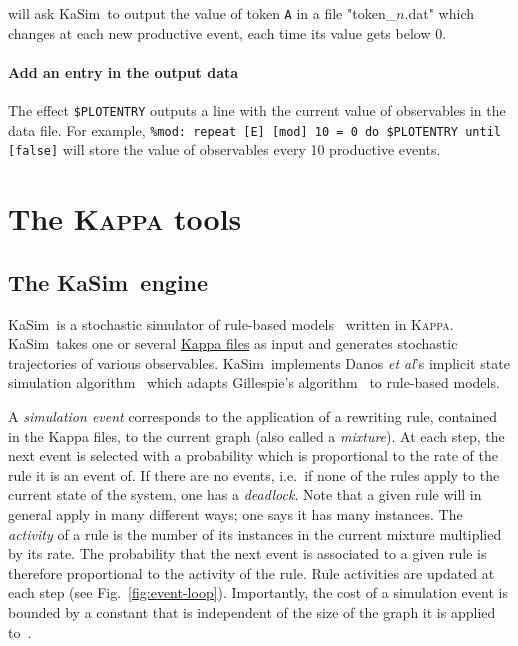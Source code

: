 \documentclass[11pt]{book}
\def\Kappa{\textsc{Kappa}}
\def\KaSim{\textsf{KaSim}}
\def\ttt#1{\texttt{#1}}
\def\ie{i.e.~}
\begin{document}
will ask \KaSim~to output the value of token \ttt{A} in a file
"token\_$n$.dat" which changes at each new productive event, each time
its value gets below 0.

\subsubsection{Add an entry in the output data}
The effect \ttt{\$PLOTENTRY} outputs a line with the current value of observables in the data file. For example,
\lstinline[language=kappa]!%mod: repeat [E] [mod] 10 = 0 do $PLOTENTRY until [false]!
will store the value of observables every 10 productive events.

\chapter{The \Kappa{} tools}
\section{The \KaSim~engine}
\KaSim~is a stochastic simulator of rule-based
models~\cite{DanLan04,Dan_etal07a,Fae_etal05} written in
\Kappa. \KaSim~takes one or several \hyperref[chap:kappa]{Kappa files}
as input and generates stochastic trajectories of various
observables. \KaSim~implements Danos \textit{et al}'s implicit state
simulation algorithm~\cite{Dan_etal07b} which adapts Gillespie's
algorithm~\cite{Gil76,Gil77} to rule-based models.

A \emph{simulation event} corresponds to the application
of a rewriting rule, contained in the Kappa files, to the current
graph (also called a \emph{mixture}).
At each step, the next event is selected with a probability which is
proportional to the rate of the rule it is an event of.
If there are no events, {\ie}if none of the rules apply to the current
state of the system, one has a \emph{deadlock}. Note that a given rule
will in general apply in many different ways; one says it has many
instances. The \emph{activity} of a rule is the number
of its instances in the current mixture multiplied by
its rate. The probability that the next event is associated to a given
rule is therefore proportional to the activity of the rule.  Rule
activities are updated at each step (see
Fig.~\ref{fig:event-loop}). Importantly, the cost of a simulation
event is bounded by a constant that is independent of the size of the
graph it is applied to~\cite{Dan_etal07b}.
\end{document}
